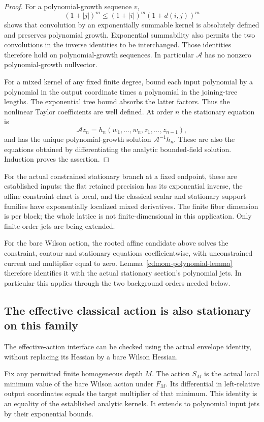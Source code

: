 \begin{proof}
For a polynomial-growth sequence \(v\),
\[
 (1+|j|)^m\le(1+|i|)^m(1+d(i,j))^m
\]
shows that convolution by an exponentially summable
kernel is absolutely defined and preserves polynomial
growth. Exponential summability also permits the two
convolutions in the inverse identities to be interchanged.
Those identities therefore hold on polynomial-growth
sequences. In particular \(\mathcal A\) has no nonzero
polynomial-growth nullvector.

For a mixed kernel of any fixed finite degree, bound
each input polynomial by a polynomial in the output
coordinate times a polynomial in the joining-tree lengths.
The exponential tree bound absorbs the latter factors.
Thus the nonlinear Taylor coefficients are well defined.
At order \(n\) the stationary equation is
\[
 \mathcal A z_n=h_n(w_1,\ldots,w_n,z_1,\ldots,z_{n-1}),
\]
and has the unique polynomial-growth solution
\(\mathcal A^{-1}h_n\). These are also the equations
obtained by differentiating the analytic bounded-field
solution. Induction proves the assertion.
\end{proof}

For the actual constrained stationary branch at a fixed
endpoint, these are established inputs: the flat retained
precision has its exponential inverse, the affine
constraint chart is local, and the classical scalar
and stationary support families have exponentially
localized mixed derivatives. The finite fiber dimension
is per block; the whole lattice is not finite-dimensional
in this application. Only finite-order jets are being
extended.

For the bare Wilson action, the rooted affine candidate
above solves the constraint, contour and stationary
equations coefficientwise, with unconstrained current
and multiplier equal to zero. Lemma~\ref{cdmom-polynomial-lemma}
therefore identifies it with the actual stationary
section's polynomial jets. In particular this applies
through the two background orders needed below.

\subsection{The effective classical action is also stationary on this family}
\label{cdmom-effective-section}

The effective-action interface can be checked using the
actual envelope identity, without replacing its Hessian
by a bare Wilson Hessian.

Fix any permitted finite homogeneous depth \(M\).
The action \(S_M\) is the actual local minimum value of
the bare Wilson action under \(F_M\). Its differential
in left-relative output coordinates equals the target
multiplier of that minimum. This identity is an equality
of the established analytic kernels. It extends to
polynomial input jets by their exponential bounds.


